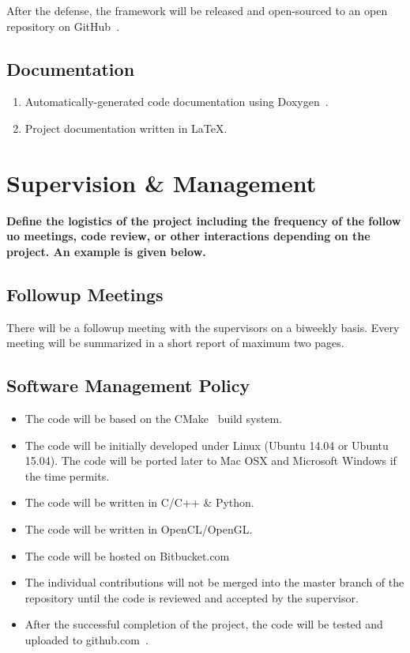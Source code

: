 \documentclass[12pt]{article} 				%
\begin{document}
After the defense, the framework will be released and open-sourced to an open repository on GitHub~\cite{github}.

\subsection{Documentation}
\begin{enumerate}
\item Automatically-generated code documentation using Doxygen~\cite{doxygen}.
\item Project documentation written in \LaTeX.
\end{enumerate}

\section{Supervision \& Management} \label{section:supervision-and-management}
\textbf{Define the logistics of the project including the frequency of the follow uo meetings, code review, or other interactions depending on the project. An example is given below.}

\vspace*{1cm}

\subsection{Followup Meetings}
There will be a followup meeting with the supervisors on a biweekly basis. Every meeting will be summarized in a short report of maximum two pages. 

\subsection{Software Management Policy}
\begin{itemize}
\item The code will be based on the CMake~\cite{cmake} build system. 
\item The code will be initially developed under Linux (Ubuntu 14.04 or Ubuntu 15.04). The code will be ported later to Mac OSX and Microsoft Windows if the time permits. 
\item The code will be written in C/C++ \& Python.
\item The code will be written in OpenCL/OpenGL.
\item The code will be hosted on Bitbucket.com~\cite{bitbucket}
\item The individual contributions will not be merged into the master branch of the repository until the code is reviewed and accepted by the supervisor.
\item After the successful completion of the project, the code will be tested and uploaded to github.com~\cite{github}. 
\end{itemize}

\newpage

		

	 
\end{document}
